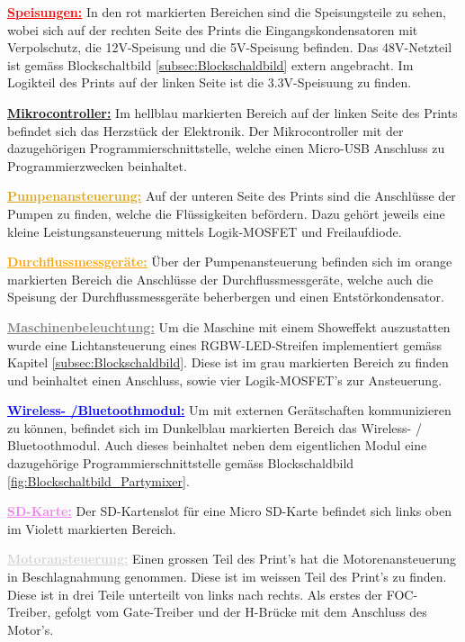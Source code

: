 \textcolor{red}{\textbf{\underline{Speisungen:}}}
In den rot markierten Bereichen sind die Speisungsteile zu sehen, wobei sich auf der rechten Seite des Prints die Eingangskondensatoren mit Verpolschutz, die 12V-Speisung und die 5V-Speisung befinden. Das 48V-Netzteil ist gemäss Blockschaltbild \ref{subsec:Blockschaldbild} extern angebracht. Im Logikteil des Prints auf der linken Seite ist die 3.3V-Speisuung zu finden.

\textcolor{ProcessBlue}{\textbf{\underline{Mikrocontroller:}}}
Im hellblau markierten Bereich auf der linken Seite des Prints befindet sich das Herzstück der Elektronik. Der Mikrocontroller mit der dazugehörigen Programmierschnittstelle, welche einen Micro-USB Anschluss zu Programmierzwecken beinhaltet.

\textcolor{Goldenrod}{\textbf{\underline{Pumpenansteuerung:}}}
Auf der unteren Seite des Prints sind die Anschlüsse der Pumpen zu finden, welche die Flüssigkeiten befördern. Dazu gehört jeweils eine kleine Leistungsansteuerung mittels Logik-MOSFET und Freilaufdiode. 

\textcolor{orange}{\textbf{\underline{Durchflussmessgeräte:}}} Über der Pumpenansteuerung befinden sich im orange markierten Bereich die Anschlüsse der Durchflussmessgeräte, welche auch die Speisung der Durchflussmessgeräte beherbergen und einen Entstörkondensator.

\textcolor{gray}{\textbf{\underline{Maschinenbeleuchtung:}}}
Um die Maschine mit einem Showeffekt auszustatten wurde eine Lichtansteuerung eines RGBW-LED-Streifen implementiert gemäss Kapitel \ref{subsec:Blockschaldbild}. Diese ist im grau markierten Bereich zu finden und beinhaltet einen Anschluss, sowie vier Logik-MOSFET's zur Ansteuerung.

\textcolor{blue}{\textbf{\underline{Wireless- /Bluetoothmodul:}}}
Um mit externen Gerätschaften kommunizieren zu können, befindet sich im Dunkelblau markierten Bereich das Wireless- / Bluetoothmodul. Auch dieses beinhaltet neben dem eigentlichen Modul eine dazugehörige Programmierschnittstelle gemäss Blockschaldbild \ref{fig:Blockschaltbild_Partymixer}.

\textcolor{violet}{\textbf{\underline{SD-Karte:}}}
Der SD-Kartenslot für eine Micro SD-Karte befindet sich links oben im Violett markierten Bereich.


\textcolor{lightgray}{\textbf{\underline{Motoransteuerung:}}}
Einen grossen Teil des Print's hat die Motorenansteuerung in Beschlagnahmung genommen. Diese ist im weissen Teil des Print's zu finden. Diese ist in drei Teile unterteilt von links nach rechts. Als erstes der FOC-Treiber, gefolgt vom Gate-Treiber und der H-Brücke mit dem Anschluss des Motor's. 

